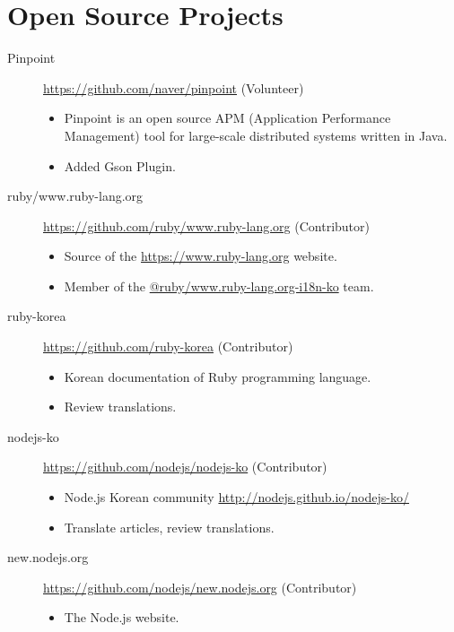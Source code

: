 \documentclass[a4paper,10pt]{article}
\begin{document}
%

\section{Open Source Projects}
\begin{description}
  \item[Pinpoint] \url{https://github.com/naver/pinpoint} (Volunteer)
    \begin{itemize}
      \item Pinpoint is an open source APM (Application Performance Management) tool for large-scale distributed systems written in Java.
      \item Added Gson Plugin.
    \end{itemize}
  \item[ruby/www.ruby-lang.org] \url{https://github.com/ruby/www.ruby-lang.org} (Contributor)
    \begin{itemize}
      \item Source of the \url{https://www.ruby-lang.org} website.
      \item Member of the \href{https://github.com/orgs/ruby/teams/www-ruby-lang-org-i18n-ko}{@ruby/www.ruby-lang.org-i18n-ko} team.
    \end{itemize}
  \item[ruby-korea] \url{https://github.com/ruby-korea} (Contributor)
    \begin{itemize}
      \item Korean documentation of Ruby programming language.
      \item Review translations.
    \end{itemize}
  \item[nodejs-ko] \url{https://github.com/nodejs/nodejs-ko} (Contributor)
    \begin{itemize}
      \item Node.js Korean community \url{http://nodejs.github.io/nodejs-ko/}
      \item Translate articles, review translations.
    \end{itemize}
  \item[new.nodejs.org] \url{https://github.com/nodejs/new.nodejs.org} (Contributor)
    \begin{itemize}
      \item The Node.js website.

\end{itemize}
\end{description}
\end{document}
